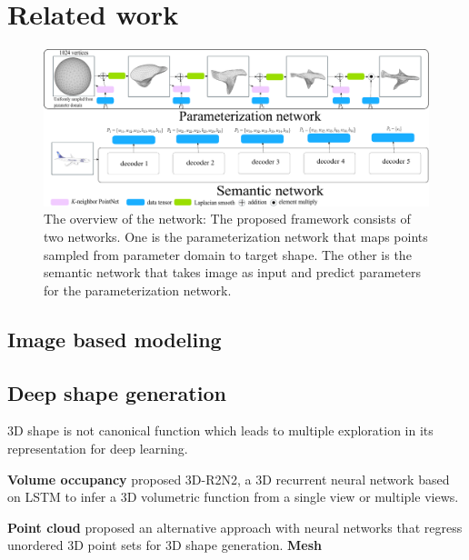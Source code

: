 \section{Related work}
\begin{figure}[htbp]
	\centering
	\includegraphics[width=\linewidth]{img/net/overview}
	\caption{The overview of the network: The proposed framework consists of two networks. One is the parameterization network that maps points sampled from parameter domain to target shape. The other is the semantic network that takes image as input and predict parameters for the parameterization network.}
	\label{fig:overview}
\end{figure}
\subsection{Image based modeling}
\subsection{Deep shape generation}
3D shape is not canonical function which leads to multiple exploration in its representation for deep learning.

\noindent\textbf{Volume occupancy}
\cite{3DR2N2} proposed 3D-R2N2, a 3D recurrent neural network based on LSTM to infer a 3D volumetric function from a single view or multiple views.

\noindent\textbf{Point cloud}
\cite{PSGN} proposed an alternative approach with neural networks that regress unordered
3D point sets for 3D shape generation. 
\noindent\textbf{Mesh}
